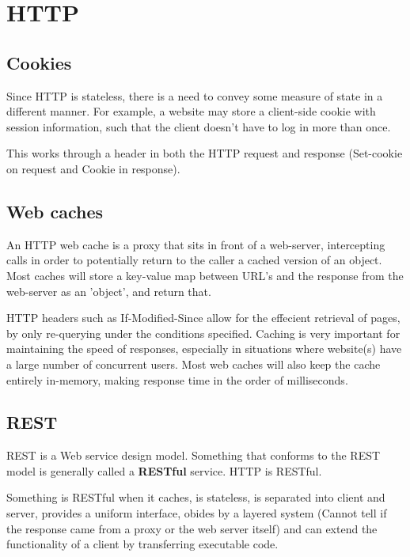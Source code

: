 \section{HTTP}
\subsection{Cookies}
Since HTTP is stateless, there is a need to convey some measure of state in
a different manner. For example, a website may store a client-side cookie with
session information, such that the client doesn't have to log in more than once.

This works through a header in both the HTTP request and response (Set-cookie on
request and Cookie in response).

\subsection{Web caches}
An HTTP web cache is a proxy that sits in front of a web-server, intercepting
calls in order to potentially return to the caller a cached version of an object.
Most caches will store a key-value map between URL's and the response from the web-server
as an 'object', and return that.

HTTP headers such as If-Modified-Since allow for the effecient retrieval of pages,
by only re-querying under the conditions specified. Caching is very important for
maintaining the speed of responses, especially in situations where website(s) have
a large number of concurrent users. Most web caches will also keep the cache entirely
in-memory, making response time in the order of milliseconds.

\subsection{REST}
REST is a Web service design model. Something that conforms to the REST model is
generally called a \textbf{RESTful} service. HTTP is RESTful.

Something is RESTful when it caches, is stateless, is separated into client and server,
provides a uniform interface, obides by a layered system (Cannot tell if the response
came from a proxy or the web server itself) and can extend the functionality of a
client by transferring executable code.
